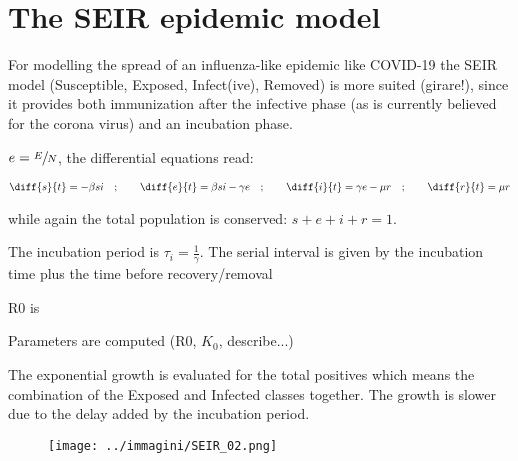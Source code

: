\documentclass[DIV=12, BCOR=0pt]{scrartcl}  %
\begin{document}
 	
%  
  
  
  
  
  

  
  
  
  \section{The SEIR epidemic model}
  For modelling the spread of an influenza-like epidemic like COVID-19 the SEIR model (Susceptible, Exposed, Infect(ive), Removed) is more suited (girare!), since it provides both immunization after the infective phase (as is currently believed for the corona virus) and an incubation phase. 
  
 $e = \sfrac{E}{N}$,  the differential equations read:
  
  \begin{align}
  	\diff{s}{t} = - \beta s i \quad;  \qquad 	\diff{e}{t} = \beta s i - \gamma e \quad; \qquad \diff{i}{t} = \gamma e - \mu r \quad; \qquad \diff{r}{t} = \mu r
  \end{align}
  
  while again the total population is conserved: $s + e + i + r = 1$.
  
 The incubation period is $\tau_{i}=\frac{1}{\gamma}$. The serial interval is given by the incubation time plus the time before recovery/removal 
 
 R0 is 
  

  
  Parameters are computed (R0, $K_{0}$, describe...)
  
  The exponential growth is evaluated for the total positives which means the combination of the Exposed and Infected classes together. The growth is slower due to the delay added by the incubation period.
  
  
  \begin{figure}[h]
  	\centering
  	\texttt{[image: ../immagini/SEIR\_02.png]}
  	\caption{}
  	\label{}
  \end{figure}
  
\end{document}
